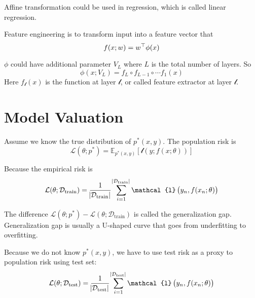 Affine transformation could be used in regression, which is called linear regression.

\begin{definition}
    Feature engineering is to transform input into a feature vector that 
    \begin{equation}
        f(x;w) = {w}^\top \phi(x)
    \end{equation}
\end{definition}

\begin{definition}\label{multi_layer_percepton}
    $\phi$ could have additional parameter $V_L$ where $L$ is the total number of layers. So
    \begin{equation}
        \phi(x;V_L) = f_L \circ f_{L-1} \circ \cdots f_1 (x)
    \end{equation}
    Here $f_{\mathcal{l}}(x)$ is the function at layer $\mathcal{l}$, or called feature extractor at layer $\mathcal{l}$.
\end{definition}


\section{Model Valuation}

\begin{definition}
    Assume we know the true distribution of $p^*(x,y)$. The population risk is
    \begin{equation}
        \mathcal{L}(\theta;p^*) = \mathbb{E}_{p^*(x,y)}\left[\mathcal{l}\left(y; f(x;\theta) \right)\right]
    \end{equation}
\end{definition}

\begin{definition}
    Because the empirical risk is 
    \begin{equation}
        \mathcal{L}(\theta;\mathcal{D}_{\text{train}}) = \frac{1}{\absolutevalue{\mathcal{D}_{\text{train}}}} \sum_{i=1}^{\absolutevalue{\mathcal{D}_{\text{train}}}} \mathcal{l}\left( y_n, f(x_n; \theta) \right)
    \end{equation}
    
    The difference $\mathcal{L}(\theta;p^*) - \mathcal{L}(\theta;\mathcal{D}_{\text{train}})$ is called the generalization gap. Generalization gap is usually a U-shaped curve that goes from underfitting to overfitting.
    
    Because we do not know $p^*(x,y)$, we have to use test risk as a proxy to population risk using test set:
    \begin{equation}
        \mathcal{L}(\theta;\mathcal{D}_{\text{test}}) = \frac{1}{\absolutevalue{\mathcal{D}_{\text{test}}}} \sum_{i=1}^{\absolutevalue{\mathcal{D}_{\text{test}}}} \mathcal{l}\left( y_n, f(x_n; \theta) \right)
    \end{equation}
\end{definition}

